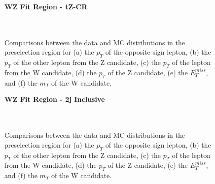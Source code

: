 \begin{figure}[H]
    \centering
    \textbf{WZ Fit Region - tZ-CR}\\
    \\
    \\
    \caption{Comparisons between the data and MC distributions in the preselection region for (a) the $p_T$ of the opposite sign lepton, (b) the $p_T$ of the other lepton from the Z candidate, (c) the $p_T$ of the lepton from the W candidate, (d) the $p_T$ of the Z candidate, (e) the $E_T^{miss}$, and (f) the $m_T$ of the W candidate.}
    \label{kin:tZ_CR_1j}
\end{figure}

\begin{figure}[H]
    \centering
    \textbf{WZ Fit Region - 2j Inclusive}\\                                                                                
    \\                   
    \\                  
    \caption{Comparisons between the data and MC distributions in the preselection region for (a) the $p_T$ of the opposite sign lepton, (b) the $p_T$ of the other lepton from the Z candidate, (c) the $p_T$ of the lepton from the W candidate, (d) the $p_T$ of the Z candidate, (e) the $E_T^{miss}$, and (f) the $m_T$ of the W candidate.}
    \label{kin:WP_2j_inc}
\end{figure}

